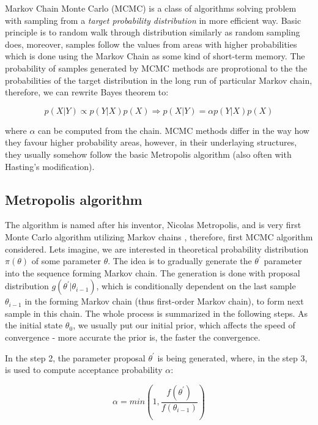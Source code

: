 \documentclass[
  digital, %
  oneside, %
  lof,     %
  lot,     %
]{fithesis4}
\begin{document}
Markov Chain Monte Carlo (MCMC) is a class of 
algorithms solving problem with sampling from a 
\textit{target probability distribution} in more 
efficient way. 
Basic principle is to random walk through 
distribution similarly as random sampling 
does, moreover, samples follow the values 
from areas with higher probabilities which is 
done using the Markov Chain as some kind 
of short-term memory. 
The probability of samples generated by 
MCMC methods are proprotional to the the 
probabilities of the target distribution in 
the long run of particular Markov chain, 
therefore, we can rewrite Bayes theorem to:

\begin{equation}
p( X | Y ) \propto p( Y | X ) p(X) \Rightarrow p( X | Y ) = \alpha p( Y | X ) p(X)
\end{equation}

where $\alpha$ can be computed from the chain. 
MCMC methods differ in the way how they favour 
higher probability areas, however, in their 
underlaying structures, they usually somehow 
follow the basic Metropolis algorithm (also 
often with Hasting's modification).

\subsection{Metropolis algorithm}

The algorithm is named after his inventor, 
Nicolas Metropolis, and is very first Monte 
Carlo algorithm utilizing Markov chains 
\cite{metropolis1953}, therefore, first 
MCMC algorithm considered.
Lets imagine, we are interested in theoretical 
probability distribution $\pi(\theta)$ of 
some parameter $\theta$. 
The idea is to gradually generate the 
$\theta^\prime$ parameter into the sequence 
forming Markov chain. 
The generation is done with proposal distribution 
$g(\theta^\prime | \theta_{i-1})$, which is 
conditionally dependent on the last sample 
$\theta_{i-1}$ in the forming Markov chain 
(thus first-order Markov chain), to form 
next sample in this chain. 
The whole process is summarized in the 
following steps. As the initial state 
$\theta_0$, we usually put our initial prior, 
which affects the speed of convergence - 
more accurate the prior is, the faster the 
convergence.

In the step 2, the parameter proposal $\theta^\prime$ 
is being generated, where, in the step 3, is used 
to compute acceptance probability $\alpha$:

\begin{equation}\label{eq:metropolis-alpha}
  \alpha = min\left(1, \frac{f(\theta^\prime)}{f(\theta_{i-1})}\right)
\end{equation}
\end{document}

